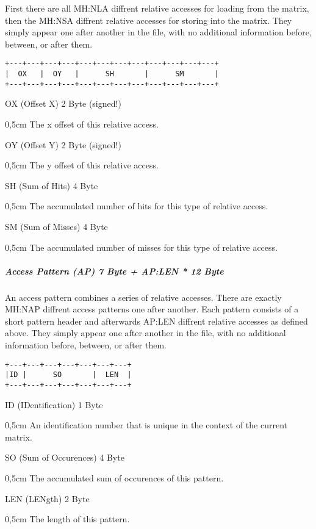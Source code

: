 First there are all MH:NLA diffrent relative accesses for loading from the matrix, then the MH:NSA diffrent 
relative accesses for storing into the matrix. They simply appear one after another in the file, with no 
additional information before, between, or after them.
\begin{verbatim}
+---+---+---+---+---+---+---+---+---+---+---+---+
|  OX   |  OY   |      SH       |      SM       |
+---+---+---+---+---+---+---+---+---+---+---+---+
\end{verbatim}
OX (Offset X) 2 Byte (signed!)
\begin{addmargin}[0,5cm]{0,5cm} 
	The x offset of this relative access.
\end{addmargin}
OY (Offset Y) 2 Byte (signed!)
\begin{addmargin}[0,5cm]{0,5cm} 
	The y offset of this relative access.
\end{addmargin}
SH (Sum of Hits) 4 Byte
\begin{addmargin}[0,5cm]{0,5cm} 
	The accumulated number of hits for this type of relative access.
\end{addmargin}
SM (Sum of Misses) 4 Byte
\begin{addmargin}[0,5cm]{0,5cm} 
	The accumulated number of misses for this type of relative access.
\end{addmargin}
\newpage
\subparagraph{Access Pattern (AP) 7 Byte + AP:LEN * 12 Byte}$\;$ \\

An access pattern combines a series of relative accesses. There are exactly MH:NAP diffrent access patterns
 one after another. Each pattern consists of a short pattern header and afterwards AP:LEN diffrent relative 
accesses as defined above. They simply appear one after another in the file, with no additional information 
before, between, or after them.
\begin{verbatim}
+---+---+---+---+---+---+---+
|ID |      SO       |  LEN  |
+---+---+---+---+---+---+---+
\end{verbatim}
ID (IDentification) 1 Byte
\begin{addmargin}[0,5cm]{0,5cm} 
	An identification number that is unique in the context of the current matrix.
\end{addmargin}
SO (Sum of Occurences) 4 Byte
\begin{addmargin}[0,5cm]{0,5cm} 
	The accumulated sum of occurences of this pattern.
\end{addmargin}
LEN (LENgth) 2 Byte
\begin{addmargin}[0,5cm]{0,5cm} 
	The length of this pattern.
\end{addmargin}
	
